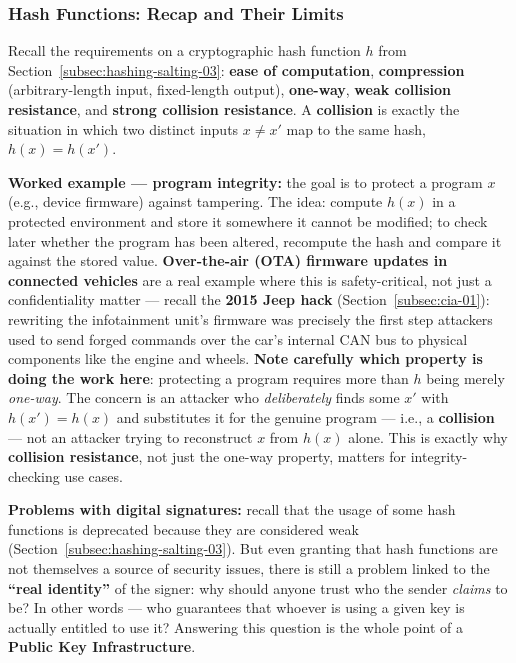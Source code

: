 \documentclass[12pt, a4paper]{article}
\begin{document}
\subsubsection{Hash Functions: Recap and Their Limits}
Recall the requirements on a cryptographic hash function $h$ from Section~\ref{subsec:hashing-salting-03}: \textbf{ease of computation}, \textbf{compression} (arbitrary-length input, fixed-length output), \textbf{one-way}, \textbf{weak collision resistance}, and \textbf{strong collision resistance}. A \textbf{collision} is exactly the situation in which two distinct inputs $x \neq x'$ map to the same hash, $h(x)=h(x')$.

\textbf{Worked example --- program integrity:} the goal is to protect a program $x$ (e.g., device firmware) against tampering. The idea: compute $h(x)$ in a protected environment and store it somewhere it cannot be modified; to check later whether the program has been altered, recompute the hash and compare it against the stored value. \textbf{Over-the-air (OTA) firmware updates in connected vehicles} are a real example where this is safety-critical, not just a confidentiality matter --- recall the \textbf{2015 Jeep hack} (Section~\ref{subsec:cia-01}): rewriting the infotainment unit's firmware was precisely the first step attackers used to send forged commands over the car's internal CAN bus to physical components like the engine and wheels. \textcolor{blue!50!black}{\textbf{Note carefully which property is doing the work here}}: protecting a program requires more than $h$ being merely \emph{one-way}. The concern is an attacker who \emph{deliberately} finds some $x'$ with $h(x')=h(x)$ and substitutes it for the genuine program --- i.e., a \textbf{collision} --- not an attacker trying to reconstruct $x$ from $h(x)$ alone. This is exactly why \textbf{collision resistance}, not just the one-way property, matters for integrity-checking use cases.

\textbf{Problems with digital signatures:} recall that the usage of some hash functions is deprecated because they are considered weak (Section~\ref{subsec:hashing-salting-03}). But even granting that hash functions are not themselves a source of security issues, there is still a problem linked to the \textbf{``real identity''} of the signer: why should anyone trust who the sender \emph{claims} to be? In other words --- who guarantees that whoever is using a given key is actually entitled to use it? Answering this question is the whole point of a \textbf{Public Key Infrastructure}.
\end{document}
